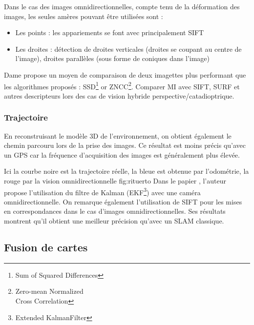 
Dans le cas des images omnidirectionnelles, compte tenu de la déformation des images, les seules amères pouvant être utilisées sont :
\begin{itemize}
\item Les points : les appariements se font avec principalement SIFT
\item Les droites : détection de droites verticales (droites se coupant au centre de l'image), droites parallèles (sous forme de coniques dans l'image)
\end{itemize}



Dame \cite{Dame10PhD} propose un moyen de comparaison de deux imagettes plus performant que les algorithmes proposés : SSD\footnote{Sum of Squared Differences} or ZNCC\footnote{Zero-mean Normalized\\Cross Correlation}.
Comparer MI avec SIFT, SURF et autres descripteurs lors des cas de vision hybride perspective/catadioptrique.  

\subsubsection{Trajectoire}

En reconstruisant le modèle 3D de l’environnement, on obtient également le chemin parcouru lors de la prise des images.
Ce résultat est moins précis qu'avec un GPS car la fréquence d'acquisition des images est généralement plus élevée.

 {Ici la courbe noire est la trajectoire réelle, la bleue est obtenue par l'odométrie, la rouge par la vision omnidirectionnelle} {fig:rituerto}
Dans le papier \cite{Rituerto10}, l'auteur propose l'utilisation du filtre de Kalman (EKF\footnote{Extended KalmanFilter}) avec une caméra omnidirectionnelle. On remarque également l'utilisation de SIFT pour les mises en correspondances dans le cas d'images omnidirectionnelles. Ses résultats montrent qu'il obtient une meilleur précision qu'avec un SLAM classique. 


\subsection{Fusion de cartes}

